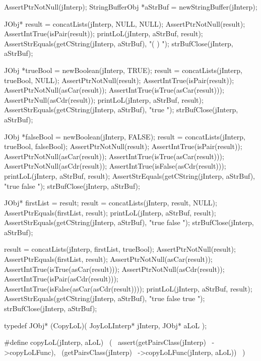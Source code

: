 \stopCCode

\startCTest
  AssertPtrNotNull(jInterp);
  StringBufferObj *aStrBuf = newStringBuffer(jInterp);
  
  JObj* result = concatLists(jInterp, NULL, NULL);
  AssertPtrNotNull(result);
  AssertIntTrue(isPair(result));
  printLoL(jInterp, aStrBuf, result);
  AssertStrEquals(getCString(jInterp, aStrBuf), "( ) ");
  strBufClose(jInterp, aStrBuf);
  
  JObj *trueBool  = newBoolean(jInterp, TRUE);
  result = concatLists(jInterp, trueBool, NULL);
  AssertPtrNotNull(result);
  AssertIntTrue(isPair(result));
  AssertPtrNotNull(asCar(result));
  AssertIntTrue(isTrue(asCar(result)));
  AssertPtrNull(asCdr(result));
  printLoL(jInterp, aStrBuf, result);
  AssertStrEquals(getCString(jInterp, aStrBuf), "true ");
  strBufClose(jInterp, aStrBuf);
  
  JObj *falseBool = newBoolean(jInterp, FALSE);
  result = concatLists(jInterp, trueBool, falseBool);
  AssertPtrNotNull(result);
  AssertIntTrue(isPair(result));
  AssertPtrNotNull(asCar(result));
  AssertIntTrue(isTrue(asCar(result)));
  AssertPtrNotNull(asCdr(result));
  AssertIntTrue(isFalse(asCdr(result)));
  printLoL(jInterp, aStrBuf, result);
  AssertStrEquals(getCString(jInterp, aStrBuf), "true false ");
  strBufClose(jInterp, aStrBuf);
  
  JObj* firstList = result;
  result = concatLists(jInterp, result, NULL);
  AssertPtrEquals(firstList, result);
  printLoL(jInterp, aStrBuf, result);
  AssertStrEquals(getCString(jInterp, aStrBuf), "true false ");
  strBufClose(jInterp, aStrBuf);
  
  result = concatLists(jInterp, firstList, trueBool);
  AssertPtrNotNull(result);
  AssertPtrEquals(firstList, result);
  AssertPtrNotNull(asCar(result));
  AssertIntTrue(isTrue(asCar(result)));
  AssertPtrNotNull(asCdr(result));
  AssertIntTrue(isPair(asCdr(result)));
  AssertIntTrue(isFalse(asCar(asCdr(result))));
  printLoL(jInterp, aStrBuf, result);
  AssertStrEquals(getCString(jInterp, aStrBuf), "true false true ");
  strBufClose(jInterp, aStrBuf);
\stopCTest
\stopTestCase
\stopTestSuite

\startTestSuite[copyLoL]

\startCHeader
typedef JObj* (CopyLoL)(
  JoyLoLInterp* jInterp,
  JObj* aLoL
);

#define copyLoL(jInterp, aLoL)      \
  (                                 \
    assert(getPairsClass(jInterp)   \
      ->copyLoLFunc),               \
    (getPairsClass(jInterp)         \
      ->copyLoLFunc(jInterp, aLoL)) \
  )
\stopCHeader


